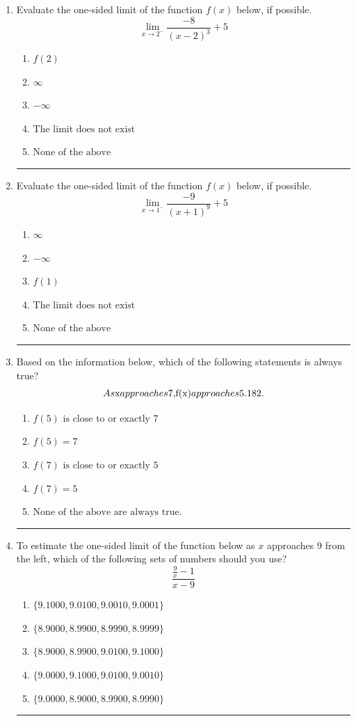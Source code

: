 \documentclass[14pt]{extbook}
\newcommand{\litem}[1]{\item#1\hspace*{-1cm}\rule{\textwidth}{0.4pt}}
\begin{document}
\begin{enumerate}
{\begin{enumerate}[label=\Alph*.]
\end{enumerate} }
\litem{
Evaluate the one-sided limit of the function $f(x)$ below, if possible.\[ \lim_{x \rightarrow 2^-} \frac{-8}{(x-2)^3}+5 \]\begin{enumerate}[label=\Alph*.]
\item \( f(2) \)
\item \( \infty \)
\item \( -\infty \)
\item \( \text{The limit does not exist} \)
\item \( \text{None of the above} \)

\end{enumerate} }
\litem{
Evaluate the one-sided limit of the function $f(x)$ below, if possible.\[ \lim_{x \rightarrow 1^-} \frac{-9}{(x+1)^9}+5 \]\begin{enumerate}[label=\Alph*.]
\item \( \infty \)
\item \( -\infty \)
\item \( f(1) \)
\item \( \text{The limit does not exist} \)
\item \( \text{None of the above} \)

\end{enumerate} }
\litem{
Based on the information below, which of the following statements is always true?\[ As $x$ approaches $7$, $f(x)$ approaches $5.182$. \]\begin{enumerate}[label=\Alph*.]
\item \( f(5) \text{ is close to or exactly } 7 \)
\item \( f(5) = 7 \)
\item \( f(7) \text{ is close to or exactly } 5 \)
\item \( f(7) = 5 \)
\item \( \text{None of the above are always true.} \)

\end{enumerate} }
\litem{
To estimate the one-sided limit of the function below as $x$ approaches 9 from the left, which of the following sets of numbers should you use?\[ \frac{\frac{9}{x} - 1}{x - 9} \]\begin{enumerate}[label=\Alph*.]
\item \( \{ 9.1000, 9.0100, 9.0010, 9.0001 \} \)
\item \( \{ 8.9000, 8.9900, 8.9990, 8.9999 \} \)
\item \( \{ 8.9000, 8.9900, 9.0100, 9.1000 \} \)
\item \( \{ 9.0000, 9.1000, 9.0100, 9.0010 \} \)
\item \( \{ 9.0000, 8.9000, 8.9900, 8.9990 \} \)

\end{enumerate} }
\end{enumerate}
\end{document}
